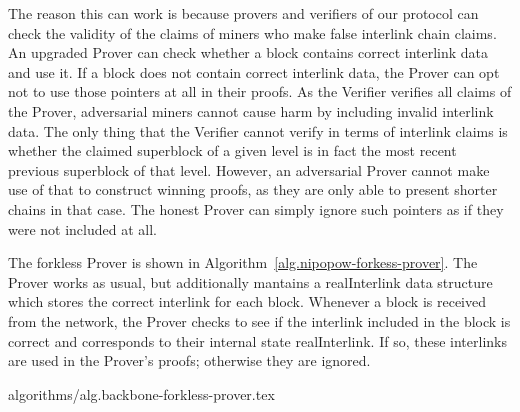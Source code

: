 The reason this can work is because provers and verifiers of our protocol can
check the validity of the claims of miners who make false interlink chain
claims. An upgraded Prover can check whether a block contains correct interlink
data and use it. If a block does not contain correct interlink data, the Prover
can opt not to use those pointers at all in their proofs. As the Verifier
verifies all claims of the Prover, adversarial miners cannot cause harm by
including invalid interlink data. The only thing that the Verifier cannot
verify in terms of interlink claims is whether the claimed superblock of a
given level is in fact the most recent previous superblock of that level.
However, an adversarial Prover cannot make use of that to construct winning
proofs, as they are only able to present shorter chains in that case. The
honest Prover can simply ignore such pointers as if they were not included at
all.

The forkless Prover is shown in Algorithm~\ref{alg.nipopow-forkess-prover}. The
Prover works as usual, but additionally mantains a realInterlink data structure
which stores the correct interlink for each block. Whenever a block is received
from the network, the Prover checks to see if the interlink included in the block is
correct and corresponds to their internal state realInterlink. If so, these
interlinks are used in the Prover's proofs; otherwise they are ignored.

{algorithms/alg.backbone-forkless-prover.tex}
